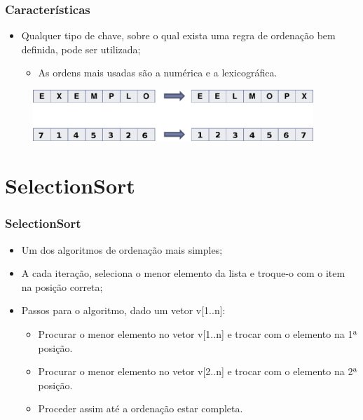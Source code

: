 \documentclass[aspectratio=169]{beamer}
\begin{document}
\begin{frame}
\frametitle{Características}
\begin{itemize}
 \item Qualquer tipo de chave, sobre o qual exista uma regra de ordenação bem definida, pode ser utilizada;
    \begin{itemize}
     \item As ordens mais usadas são a numérica e a lexicográfica.
    \end{itemize}
\end{itemize}    
\begin{figure}[!h]
  \centering
  \includegraphics[width=300pt]{imgs/numerica_lexicografica.png}
  \label{fig_numerica_lexicografica}
\end{figure}
\end{frame}

\section{SelectionSort}

\begin{frame}
\frametitle{SelectionSort}
\begin{itemize}
 \item Um dos algoritmos de ordenação mais simples; 
 \item A cada iteração, seleciona o menor elemento da lista e troque-o com o item na posição correta;
 \item Passos para o algoritmo, dado um vetor v[1..n]:
    \begin{itemize}
    \item Procurar o menor elemento no vetor v[1..n] e trocar com o elemento na 1ª posição.
    \item Procurar o menor elemento no vetor v[2..n] e trocar com o elemento na 2ª posição.
    \item Proceder assim até a ordenação estar completa.
    \end{itemize}
 \end{itemize}
\end{frame}
\end{document}
